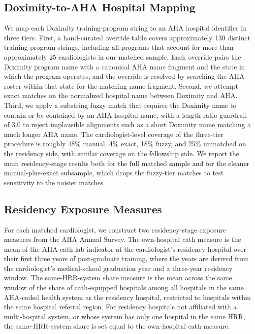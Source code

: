 \documentclass[12pt]{article}
\begin{document}
\subsection{Doximity-to-AHA Hospital Mapping}

We map each Doximity training-program string to an AHA hospital identifier in three tiers. First, a hand-curated override table covers approximately 130 distinct training-program strings, including all programs that account for more than approximately 25 cardiologists in our matched sample. Each override pairs the Doximity program name with a canonical AHA name fragment and the state in which the program operates, and the override is resolved by searching the AHA roster within that state for the matching name fragment. Second, we attempt exact matches on the normalized hospital name between Doximity and AHA. Third, we apply a substring fuzzy match that requires the Doximity name to contain or be contained by an AHA hospital name, with a length-ratio guardrail of 3.0 to reject implausible alignments such as a short Doximity name matching a much longer AHA name. The cardiologist-level coverage of the three-tier procedure is roughly 48\% manual, 4\% exact, 18\% fuzzy, and 25\% unmatched on the residency side, with similar coverage on the fellowship side. We report the main residency-stage results both for the full matched sample and for the cleaner manual-plus-exact subsample, which drops the fuzzy-tier matches to test sensitivity to the noisier matches.

\subsection{Residency Exposure Measures}

For each matched cardiologist, we construct two residency-stage exposure measures from the AHA Annual Survey. The own-hospital cath measure is the mean of the AHA cath lab indicator at the cardiologist's residency hospital over their first three years of post-graduate training, where the years are derived from the cardiologist's medical-school graduation year and a three-year residency window. The same-HRR-system share measure is the mean across the same window of the share of cath-equipped hospitals among all hospitals in the same AHA-coded health system as the residency hospital, restricted to hospitals within the same hospital referral region. For residency hospitals not affiliated with a multi-hospital system, or whose system has only one hospital in the same HRR, the same-HRR-system share is set equal to the own-hospital cath measure.
\end{document}
